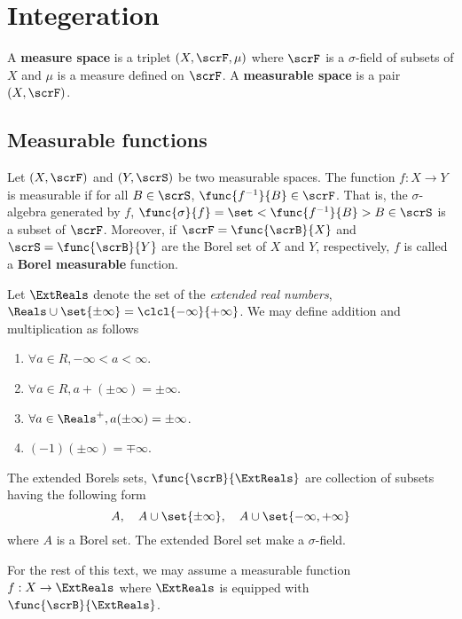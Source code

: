 \chapter{Integeration}
\begin{definition}
    A \textbf{measure space} is a triplet \((X,\scrF,\mu)\) where \(\scrF\) is a \(\sigma\)-field of subsets of \(X\) and \(\mu\) is a measure defined on \(\scrF\). A \textbf{measurable space} is a pair \((X,\scrF)\).
\end{definition}
\section{Measurable functions}
Let \((X,\scrF)\) and \((Y,\scrS)\) be two measurable spaces. The function \(f:X\to Y\) is measurable if for all \(B \in \scrS\), \(\func{f^{-1}}{B} \in \scrF\). That is, the \(\sigma\)-algebra generated by \(f\), \(\func{\sigma}{f} = \set<\func{f^{-1}}{B}>{B \in \scrS}\) is a subset of \(\scrF\). Moreover, if \(\scrF = \func{\scrB}{X}\) and \(\scrS = \func{\scrB}{Y}\) are the Borel set of \(X\) and \(Y\), respectively, \(f\) is called a \textbf{Borel measurable} function. 

Let \(\ExtReals\) denote the set of the \textit{extended real numbers}, \(\Reals \cup \set{\pm \infty} = \clcl{-\infty}{+\infty}\). We may define addition and multiplication as follows 
\begin{enumerate}
    \item \(\forall a \in R, -\infty < a < \infty\).
    \item \(\forall a \in R, a + (\pm \infty) = \pm \infty\).
    \item \(\forall a \in \Reals^+, a(\pm \infty) = \pm \infty\).
    \item \((-1)(\pm \infty) = \mp \infty\).
\end{enumerate}
The extended Borels sets, \(\func{\scrB}{\ExtReals}\) are collection of subsets having the following form 
\begin{equation*}
    A, \quad A \cup \set{\pm \infty}, \quad A \cup \set{-\infty, + \infty}
\end{equation*}
where \(A\) is a Borel set. The extended Borel set make a \(\sigma\)-field. 

For the rest of this text, we may assume a measurable function \(f: X \to \ExtReals\) where \(\ExtReals\) is equipped with \(\func{\scrB}{\ExtReals}\). 

